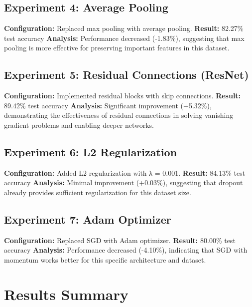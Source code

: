 \documentclass{article}
\begin{document}
\subsection{Experiment 4: Average Pooling}
\textbf{Configuration:} Replaced max pooling with average pooling.
\textbf{Result:} 82.27\% test accuracy
\textbf{Analysis:} Performance decreased (-1.83\%), suggesting that max pooling is more effective for preserving important features in this dataset.

\subsection{Experiment 5: Residual Connections (ResNet)}
\textbf{Configuration:} Implemented residual blocks with skip connections.
\textbf{Result:} 89.42\% test accuracy
\textbf{Analysis:} Significant improvement (+5.32\%), demonstrating the effectiveness of residual connections in solving vanishing gradient problems and enabling deeper networks.

\subsection{Experiment 6: L2 Regularization}
\textbf{Configuration:} Added L2 regularization with λ = 0.001.
\textbf{Result:} 84.13\% test accuracy
\textbf{Analysis:} Minimal improvement (+0.03\%), suggesting that dropout already provides sufficient regularization for this dataset size.

\subsection{Experiment 7: Adam Optimizer}
\textbf{Configuration:} Replaced SGD with Adam optimizer.
\textbf{Result:} 80.00\% test accuracy
\textbf{Analysis:} Performance decreased (-4.10\%), indicating that SGD with momentum works better for this specific architecture and dataset.

\section{Results Summary}
\end{document}
